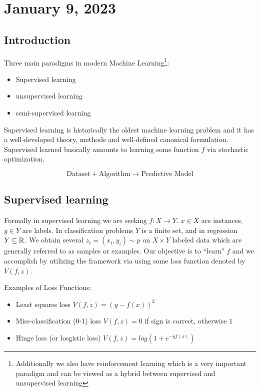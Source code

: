 \section{January 9, 2023}
\subsection{Introduction}
    Three main paradigms in modern Machine Learning\footnote{Additionally we also have reinforcement learning which is a very important paradigm and can be viewed as a hybrid between supervised and unsupervised learning}:
\begin{itemize}
    \item  Supervised learning 
    \item unsupervised learning 
    \item semi-supervised learning
\end{itemize}
Supervised learning is historically the oldest machine learning problem and it has a well-developed theory, methods and well-defined canonical formulation. Supervised learned basically amounts to learning some function $f$ via stochastic optimization.

$$
\text{Dataset} + \text{Algorithm} \to \text{Predictive Model}
$$





\subsection{Supervised learning}
Formally in supervised learning we are seeking $f:X \to Y$. 
$x \in X$ are instances, $y \in Y$ are labels. 
In classification problems $Y$ is a finite set, and in regression $ Y \subseteq \mathbb R$. 
We obtain several $z_i = (x_i, y_i) \sim p$ on  $X \times Y$ labeled data which are generally referred to as samples or examples.
Our objective is to ``learn" $f$ and we accomplish by utilizing the  framework via using some loss function denoted by $V(f,z)$.

Examples of Loss Functions: 
\begin{itemize}
    \item Least squares loss $V(f,z) = (y - f(x))^2$
    \item Miss-classification (0-1) loss $V(f,z) = 0$ if sign is correct, otherwise $1$
    \item Hinge loss (or losgistic loss) $V(f,z) = log(1 + e^{-yf(x)})$
\end{itemize}

